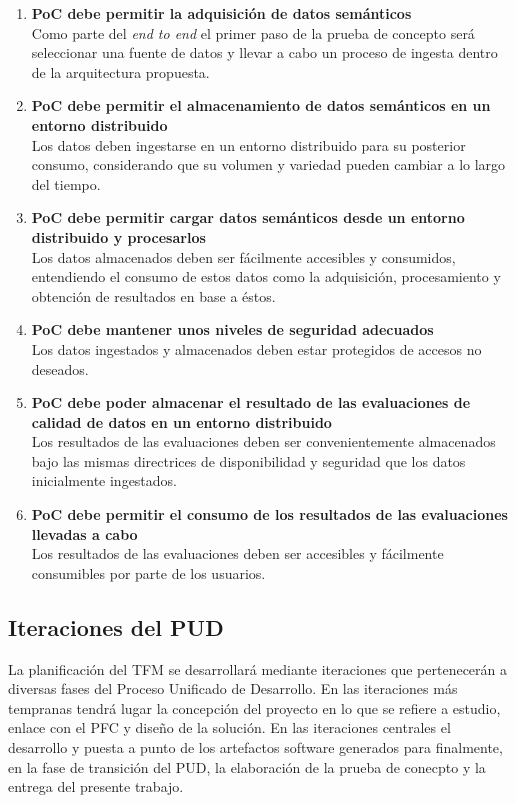 \begin{enumerate}
\item \textbf{\acs{PoC} debe permitir la adquisición de datos semánticos}\\Como parte
  del \textit{end to end} el primer paso de la prueba de concepto será
  seleccionar una fuente de datos y llevar a cabo un proceso de ingesta dentro
  de la arquitectura propuesta. 
  
\item \textbf{\acs{PoC} debe permitir el almacenamiento de datos semánticos en un
  entorno distribuido}\\Los datos deben ingestarse en un entorno distribuido
  para su posterior consumo, considerando que su volumen y variedad pueden
  cambiar a lo largo del tiempo. 
\item \textbf{\acs{PoC} debe permitir cargar datos semánticos desde un entorno
  distribuido y procesarlos}\\Los datos almacenados deben ser fácilmente
  accesibles y consumidos, entendiendo el consumo de estos datos como la
  adquisición, procesamiento y obtención de resultados en base a éstos. 
\item \textbf{\acs{PoC} debe mantener unos niveles de seguridad adecuados}\\Los datos
  ingestados y almacenados deben estar protegidos de accesos no deseados. 
\item \textbf{\acs{PoC} debe poder almacenar el resultado de las evaluaciones de
  calidad de datos en un entorno distribuido}\\Los resultados de las
  evaluaciones deben ser convenientemente almacenados bajo las mismas
  directrices de disponibilidad y seguridad que los datos inicialmente ingestados.
\item \textbf{\acs{PoC} debe permitir el consumo de los resultados de las evaluaciones
  llevadas a cabo}\\Los resultados de las evaluaciones deben ser accesibles y
  fácilmente consumibles por parte de los usuarios. 
\end{enumerate}


\subsection{Iteraciones del \acs{PUD}}

La planificación del \acs{TFM} se desarrollará mediante iteraciones que
pertenecerán a diversas fases del Proceso Unificado de Desarrollo. En las
iteraciones más tempranas tendrá lugar la concepción del proyecto en lo que se
refiere a estudio, enlace con el \acs{PFC} y diseño de la solución. En las
iteraciones centrales el desarrollo y puesta a punto de los artefactos software
generados para finalmente, en la fase de transición del \acs{PUD}, la
elaboración de la prueba de conecpto y la entrega del presente trabajo. 

